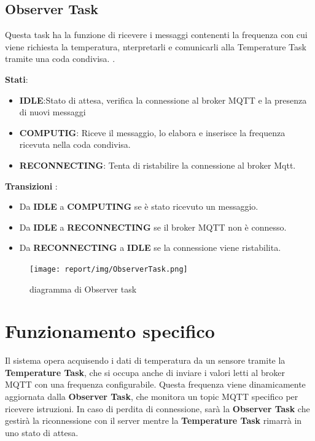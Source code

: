\documentclass{report}
\begin{document}
\subsection{Observer Task}

\par{
    Questa task ha la funzione di ricevere i messaggi contenenti la frequenza con cui viene richiesta la temperatura, nterpretarli e comunicarli alla Temperature Task tramite una coda condivisa.
    .\newline
}
\par{\textbf{Stati}:}
\begin{itemize}
    \item \textbf{IDLE}:Stato di attesa, verifica la connessione al broker MQTT e la presenza di nuovi messaggi
    \item \textbf{COMPUTIG}: Riceve il messaggio, lo elabora e inserisce la frequenza ricevuta nella coda condivisa.
    \item \textbf{RECONNECTING}: Tenta di ristabilire la connessione al broker Mqtt.
\end{itemize}
\par{
    \textbf{Transizioni} :
}
\begin{itemize}
    \item Da \textbf{IDLE} a \textbf{COMPUTING} se è stato ricevuto un messaggio.
    \item Da \textbf{IDLE} a \textbf{RECONNECTING} se il broker MQTT non è connesso.
    \item Da \textbf{RECONNECTING} a \textbf{IDLE} se la connessione viene ristabilita.
\end{itemize}

\begin{figure}[h]
    \centering
    \texttt{[image: report/img/ObserverTask.png]}
    \caption{diagramma di Observer task}
    \label{fig:stati}
\end{figure}

\section{Funzionamento specifico}
\par{
Il sistema opera acquisendo i dati di temperatura da un sensore tramite la \textbf{Temperature Task}, che si occupa anche di inviare i valori letti al broker MQTT con una frequenza configurabile. Questa frequenza viene dinamicamente aggiornata dalla \textbf{Observer Task}, che monitora un topic MQTT specifico per ricevere istruzioni. In caso di perdita di connessione, sarà la \textbf{Observer Task} che gestirà la riconnessione con il server mentre la \textbf{Temperature Task} rimarrà in uno stato di attesa.
}
\end{document}
